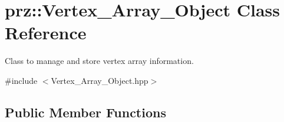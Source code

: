 \hypertarget{classprz_1_1_vertex___array___object}{}\section{prz\+::Vertex\+\_\+\+Array\+\_\+\+Object Class Reference}
\label{classprz_1_1_vertex___array___object}


Class to manage and store vertex array information.  




{\ttfamily \#include $<$Vertex\+\_\+\+Array\+\_\+\+Object.\+hpp$>$}

\subsection*{Public Member Functions}
